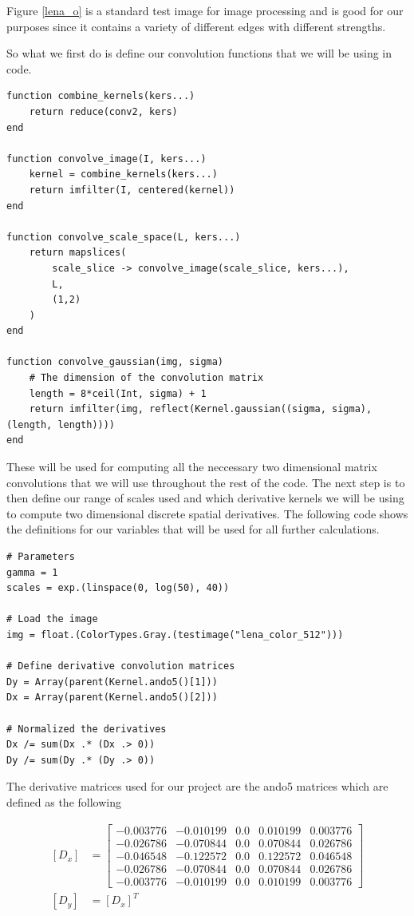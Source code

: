 \documentclass{article}
\begin{document}
Figure \ref{lena_o} is a standard test image for image processing and is good for our purposes since it contains a variety of different edges with different strengths.

So what we first do is define our convolution functions that we will be using in code.

\begin{lstlisting}
function combine_kernels(kers...)
    return reduce(conv2, kers)
end

function convolve_image(I, kers...)
    kernel = combine_kernels(kers...)
    return imfilter(I, centered(kernel))
end

function convolve_scale_space(L, kers...)
    return mapslices(
        scale_slice -> convolve_image(scale_slice, kers...),
        L,
        (1,2)
    )
end

function convolve_gaussian(img, sigma)
    # The dimension of the convolution matrix
    length = 8*ceil(Int, sigma) + 1
    return imfilter(img, reflect(Kernel.gaussian((sigma, sigma), (length, length))))
end
\end{lstlisting}

These will be used for computing all the neccessary two dimensional matrix convolutions that we will use throughout the rest of the code.
The next step is to then define our range of scales used and which derivative kernels we will be using to compute two dimensional discrete spatial derivatives.
The following code shows the definitions for our variables that will be used for all further calculations. 

\begin{lstlisting}
# Parameters
gamma = 1
scales = exp.(linspace(0, log(50), 40))

# Load the image
img = float.(ColorTypes.Gray.(testimage("lena_color_512")))

# Define derivative convolution matrices
Dy = Array(parent(Kernel.ando5()[1]))
Dx = Array(parent(Kernel.ando5()[2]))

# Normalized the derivatives
Dx /= sum(Dx .* (Dx .> 0))
Dy /= sum(Dy .* (Dy .> 0))
\end{lstlisting}

The derivative matrices used for our project are the ando5 matrices which are defined as the following

\begin{equation}
  \begin{aligned}
    [D_x] &=
    \begin{bmatrix}
      -0.003776 &-0.010199  &0.0  &0.010199  &0.003776 \\
      -0.026786 &-0.070844  &0.0  &0.070844  &0.026786 \\
      -0.046548 &-0.122572  &0.0  &0.122572  &0.046548 \\
      -0.026786 &-0.070844  &0.0  &0.070844  &0.026786 \\
      -0.003776 &-0.010199  &0.0  &0.010199  &0.003776
    \end{bmatrix} \\
    [D_y] &= [D_x]^T
  \end{aligned}
\end{equation}
\end{document}
